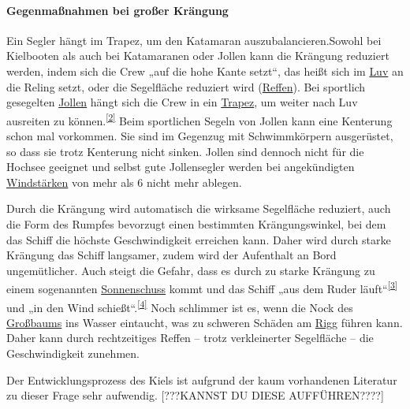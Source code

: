 \paragraph{Gegenmaßnahmen bei großer Krängung}

Ein Segler hängt im Trapez, um den Katamaran auszubalancieren.Sowohl bei Kielbooten als auch bei Katamaranen oder Jollen kann die Krängung reduziert werden, indem sich die Crew „auf die hohe Kante setzt“, das heißt sich im \href{https://de.wikipedia.org/wiki/Luv_und_Lee}{Luv} an die Reling setzt, oder die Segelfläche reduziert wird (\href{https://de.wikipedia.org/wiki/Reffen}{Reffen}). Bei sportlich gesegelten \href{https://de.wikipedia.org/wiki/Jolle}{Jollen} hängt sich die Crew in ein \href{https://de.wikipedia.org/wiki/Trapez_(Segeln)}{Trapez}, um weiter nach Luv ausreiten zu können.\textsuperscript{\href{https://de.wikipedia.org/wiki/Stabilit\%C3\%A4t_(Schiffsk\%C3\%B6rper)\#cite_note-2}{[2]}} Beim sportlichen Segeln von Jollen kann eine Kenterung schon mal vorkommen. Sie sind im Gegenzug mit Schwimmkörpern ausgerüstet, so dass sie trotz Kenterung nicht sinken. Jollen sind dennoch nicht für die Hochsee geeignet und selbst gute Jollensegler werden bei angekündigten \href{https://de.wikipedia.org/wiki/Beaufort-Skala}{Windstärken} von mehr als 6 nicht mehr ablegen. 

Durch die Krängung wird automatisch die wirksame Segelfläche reduziert, auch die Form des Rumpfes bevorzugt einen bestimmten Krängungswinkel, bei dem das Schiff die höchste Geschwindigkeit erreichen kann. Daher wird durch starke Krängung das Schiff langsamer, zudem wird der Aufenthalt an Bord ungemütlicher. Auch steigt die Gefahr, dass es durch zu starke Krängung zu einem sogenannten \href{https://de.wikipedia.org/wiki/Sonnenschuss}{Sonnenschuss} kommt und das Schiff „aus dem Ruder läuft“\textsuperscript{\href{https://de.wikipedia.org/wiki/Stabilit\%C3\%A4t_(Schiffsk\%C3\%B6rper)\#cite_note-3}{[3]}} und „in den Wind schießt“.\textsuperscript{\href{https://de.wikipedia.org/wiki/Stabilit\%C3\%A4t_(Schiffsk\%C3\%B6rper)\#cite_note-4}{[4]}} Noch schlimmer ist es, wenn die Nock des \href{https://de.wikipedia.org/wiki/Baum_(Segeln)}{Großbaums} ins Wasser eintaucht, was zu schweren Schäden am \href{https://de.wikipedia.org/wiki/Takelage}{Rigg} führen kann. Daher kann durch rechtzeitiges Reffen – trotz verkleinerter Segelfläche – die Geschwindigkeit zunehmen. 

 


Der Entwicklungsprozess des Kiels ist aufgrund der kaum vorhandenen Literatur zu dieser Frage sehr aufwendig. [???KANNST DU DIESE AUFFÜHREN????]\\ 

